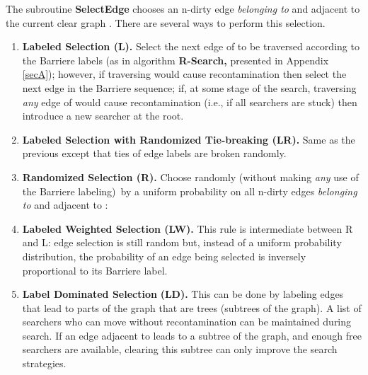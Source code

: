 \documentclass[11pt]{article}\usepackage{amsmath}
\begin{document}
The subroutine \textbf{SelectEdge} chooses an n-dirty edge 
\emph{belonging to } and adjacent to the current clear graph
. There are several ways to perform this selection.

\begin{enumerate}
\item \textbf{Labeled Selection (L). }Select the next edge  of
 to be traversed according to the Barriere  labels (as in
algorithm \textbf{R-Search, }presented in Appendix \ref{secA}); however, if
traversing  would cause recontamination then select the next edge in the
Barriere sequence; if, at some stage of the search, traversing \emph{any} edge
of  would cause recontamination (i.e., if all searchers are stuck)
then introduce a new searcher at the root.

\item \textbf{Labeled Selection with Randomized Tie-breaking (LR).} Same as
the previous except that ties of edge labels are broken randomly.

\item \textbf{Randomized Selection (R). }Choose  randomly (without making
\emph{any} use of the Barriere labeling)\ by a uniform probability on all
n-dirty edges \emph{belonging to } and adjacent to :


\item \textbf{Labeled Weighted Selection (LW). }This rule is intermediate
between R and L: edge selection is still random but, instead of a uniform
probability distribution, the probability of an edge  being selected is
inversely proportional to its Barriere  label.

\item \textbf{Label Dominated Selection} \textbf{(LD).} This can be done by
labeling edges that lead to parts of the graph that are trees (subtrees of the
graph). A list of searchers who can move without recontamination can be
maintained during search. If an edge adjacent to 
leads to a subtree of the graph, and enough free searchers are available,
clearing this subtree can only improve the search strategies.
\end{enumerate}
\end{document}
